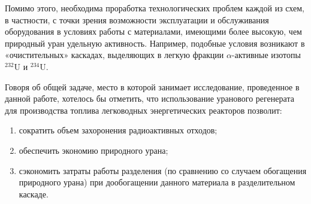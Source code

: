 Помимо этого, необходима проработка технологических проблем каждой из схем, в частности, с точки зрения возможности эксплуатации и обслуживания оборудования в условиях работы с материалами, имеющими более высокую, чем природный уран удельную активность. Например, подобные условия возникают в «очистительных» каскадах, выделяющих в легкую фракции $\alpha$-активные изотопы $^{232}$U и $^{234}$U. 


Говоря об общей задаче, место в которой занимает исследование, проведенное в данной работе, хотелось бы отметить, что использование уранового регенерата для производства топлива легководных энергетических реакторов позволит: 
\begin{enumerate}
  \item сократить объем захоронения радиоактивных отходов; 
  \item обеспечить экономию природного урана;
  \item сэкономить затраты работы разделения (по сравнению со случаем обогащения природного урана) при дообогащении данного материала в разделительном каскаде. 
\end{enumerate}
